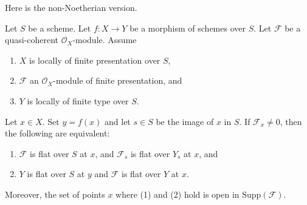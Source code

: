 \noindent
Here is the non-Noetherian version.

\begin{theorem}
\label{theorem-criterion-flatness-fibre}
Let $S$ be a scheme.
Let $f : X \to Y$ be a morphism of schemes over $S$.
Let $\mathcal{F}$ be a quasi-coherent $\mathcal{O}_X$-module.
Assume
\begin{enumerate}
\item $X$ is locally of finite presentation over $S$,
\item $\mathcal{F}$ an $\mathcal{O}_X$-module of finite presentation, and
\item $Y$ is locally of finite type over $S$.
\end{enumerate}
Let $x \in X$. Set $y = f(x)$ and let $s \in S$ be the image of $x$ in $S$.
If $\mathcal{F}_x \not = 0$, then the following are equivalent:
\begin{enumerate}
\item $\mathcal{F}$ is flat over $S$ at $x$, and
$\mathcal{F}_s$ is flat over $Y_s$ at $x$, and
\item $Y$ is flat over $S$ at $y$ and $\mathcal{F}$ is
flat over $Y$ at $x$.
\end{enumerate}
Moreover, the set of points $x$ where (1) and (2) hold is open in
$\text{Supp}(\mathcal{F})$.
\end{theorem}

